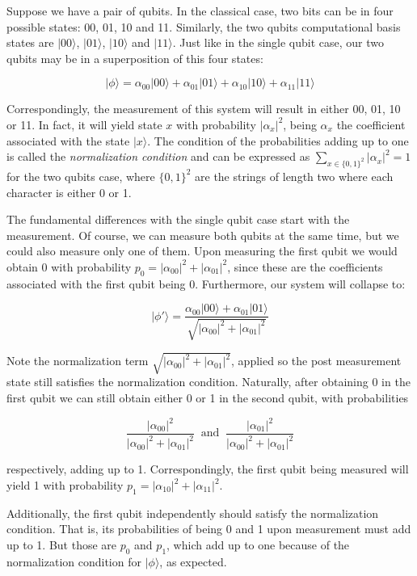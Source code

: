 Suppose we have a pair of qubits. In the classical case, two bits can be in four possible states: 00, 01, 10 and 11. Similarly, the two qubits computational basis states are $|00\rangle$, $|01\rangle$, $|10\rangle$ and $|11\rangle$. Just like in the single qubit case, our two qubits may be in a superposition of this four states:


$$ |\phi\rangle = \alpha_{00} |00\rangle + \alpha_{01} |01\rangle + \alpha_{10} |10\rangle + \alpha_{11} |11\rangle $$

Correspondingly, the measurement of this system will result in either 00, 01, 10 or 11. In fact, it will yield state $x$ with probability $|\alpha_x|^2$, being $\alpha_x$ the coefficient associated with the state $|x\rangle$. The condition of the probabilities adding up to one is called the \emph{normalization condition} and can be expressed as $\sum_{x \in \{0,1\}^2} |\alpha_x|^2 = 1$ for the two qubits case, where $\{0,1\}^2$ are the strings of length two where each character is either 0 or 1.

The fundamental differences with the single qubit case start with the measurement. Of course, we can measure both qubits at the same time, but we could also measure only one of them. Upon measuring the first qubit we would obtain 0 with probability $p_0 = |\alpha_{00}|^2 + |\alpha_{01}|^2$, since these are the coefficients associated with the first qubit being 0. Furthermore, our system will collapse to:

$$ |\phi'\rangle = \frac{ \alpha_{00} |00\rangle + \alpha_{01} |01\rangle }{ \sqrt{|\alpha_{00}|^2 + |\alpha_{01}|^2} } $$

Note the normalization term $\sqrt{|\alpha_{00}|^2 + |\alpha_{01}|^2}$, applied so the post measurement state still satisfies the normalization condition. Naturally, after obtaining 0 in the first qubit we can still obtain either 0 or 1 in the second qubit, with probabilities 

$$ \frac{ |\alpha_{00}|^2 }{ |\alpha_{00}|^2 + |\alpha_{01}|^2 }  \ \text{ and } \ 
\frac{ |\alpha_{01}|^2 }{ |\alpha_{00}|^2 + |\alpha_{01}|^2 } $$

respectively, adding up to 1. Correspondingly, the first qubit being measured will yield 1 with probability $p_1 = |\alpha_{10}|^2 + |\alpha_{11}|^2$.

Additionally, the first qubit independently should satisfy the normalization condition. That is, its probabilities of being 0 and 1 upon measurement must add up to 1. But those are $p_0$ and $p_1$, which add up to one because of the normalization condition for $|\phi\rangle$, as expected.

